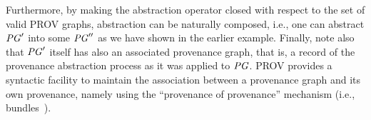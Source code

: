 Furthermore, by making the abstraction operator closed with respect to the set of valid PROV graphs, abstraction can be naturally composed, i.e., one can abstract $\mathit{PG}'$ into some $\mathit{PG}''$ as we have shown in the earlier example.
%
Finally, note also that $\mathit{PG}'$ itself has also an associated provenance graph, that is, a record of the provenance abstraction process as it was applied to $\mathit{PG}$. 
PROV provides a syntactic facility to maintain the association between a provenance graph and its own provenance, namely using the ``provenance of provenance'' mechanism (i.e., bundles~\citep{w3c-prov-dm}).




%

